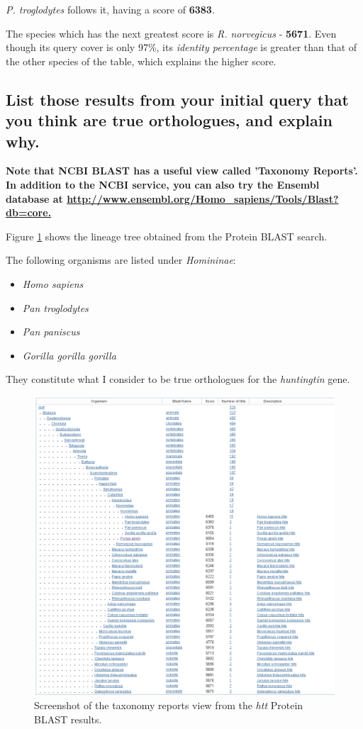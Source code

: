 \textit{P. troglodytes} follows it, having a score of \textbf{6383}.

The species which has the next greatest score is \textit{R. norvegicus} - \textbf{5671}. Even though its query cover is only 97\%, its \textit{identity percentage} is greater than that of the other species of the table, which explains the higher score.


\subsection{List those results from your initial query that you think are true orthologues, and explain why.}

\textbf{Note that NCBI BLAST has a useful view called 'Taxonomy Reports'. In addition to the NCBI service, you can also try the Ensembl database at \url{http://www.ensembl.org/Homo_sapiens/Tools/Blast?db=core.}}

Figure \ref{fig:blastp-taxonomy-view} shows the lineage tree obtained from the Protein BLAST search.

The following organisms are listed under \textit{Homininae}:

\begin{multicols}{2}
    \begin{itemize}
        \item \textit{Homo sapiens}
        \item \textit{Pan troglodytes}
        \item \textit{Pan paniscus}
        \item \textit{Gorilla gorilla gorilla}
    \end{itemize}
\end{multicols}

They constitute what I consider to be true orthologues for the \textit{huntingtin} gene.

\newpage

\begin{figure}[ht]
    \centering
    \includegraphics[width=\linewidth]{res/blastp-taxonomy-view.png}
    \caption{Screenshot of the taxonomy reports view from the \textit{htt} Protein BLAST results.}
    \label{fig:blastp-taxonomy-view}
\end{figure}

\newpage
